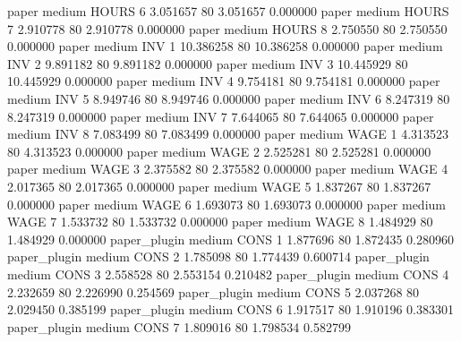          paper     medium    HOURS                 6  3.051657 80       3.051657           0.000000
         paper     medium    HOURS                 7  2.910778 80       2.910778           0.000000
         paper     medium    HOURS                 8  2.750550 80       2.750550           0.000000
         paper     medium      INV                 1 10.386258 80      10.386258           0.000000
         paper     medium      INV                 2  9.891182 80       9.891182           0.000000
         paper     medium      INV                 3 10.445929 80      10.445929           0.000000
         paper     medium      INV                 4  9.754181 80       9.754181           0.000000
         paper     medium      INV                 5  8.949746 80       8.949746           0.000000
         paper     medium      INV                 6  8.247319 80       8.247319           0.000000
         paper     medium      INV                 7  7.644065 80       7.644065           0.000000
         paper     medium      INV                 8  7.083499 80       7.083499           0.000000
         paper     medium     WAGE                 1  4.313523 80       4.313523           0.000000
         paper     medium     WAGE                 2  2.525281 80       2.525281           0.000000
         paper     medium     WAGE                 3  2.375582 80       2.375582           0.000000
         paper     medium     WAGE                 4  2.017365 80       2.017365           0.000000
         paper     medium     WAGE                 5  1.837267 80       1.837267           0.000000
         paper     medium     WAGE                 6  1.693073 80       1.693073           0.000000
         paper     medium     WAGE                 7  1.533732 80       1.533732           0.000000
         paper     medium     WAGE                 8  1.484929 80       1.484929           0.000000
  paper_plugin     medium     CONS                 1  1.877696 80       1.872435           0.280960
  paper_plugin     medium     CONS                 2  1.785098 80       1.774439           0.600714
  paper_plugin     medium     CONS                 3  2.558528 80       2.553154           0.210482
  paper_plugin     medium     CONS                 4  2.232659 80       2.226990           0.254569
  paper_plugin     medium     CONS                 5  2.037268 80       2.029450           0.385199
  paper_plugin     medium     CONS                 6  1.917517 80       1.910196           0.383301
  paper_plugin     medium     CONS                 7  1.809016 80       1.798534           0.582799
